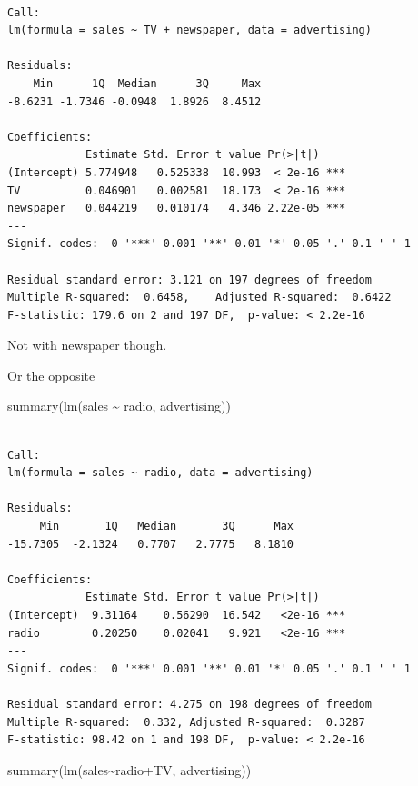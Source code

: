 \documentclass[
  letterpaper,
  DIV=11,
  numbers=noendperiod]{scrreprt}
\newenvironment{Shaded}{\begin{snugshade}}{\end{snugshade}}
\newcommand{\FunctionTok}[1]{\textcolor[rgb]{0.28,0.35,0.67}{#1}}
\newcommand{\NormalTok}[1]{\textcolor[rgb]{0.00,0.23,0.31}{#1}}
\newcommand{\SpecialCharTok}[1]{\textcolor[rgb]{0.37,0.37,0.37}{#1}}
\begin{document}
\begin{verbatim}

Call:
lm(formula = sales ~ TV + newspaper, data = advertising)

Residuals:
    Min      1Q  Median      3Q     Max 
-8.6231 -1.7346 -0.0948  1.8926  8.4512 

Coefficients:
            Estimate Std. Error t value Pr(>|t|)    
(Intercept) 5.774948   0.525338  10.993  < 2e-16 ***
TV          0.046901   0.002581  18.173  < 2e-16 ***
newspaper   0.044219   0.010174   4.346 2.22e-05 ***
---
Signif. codes:  0 '***' 0.001 '**' 0.01 '*' 0.05 '.' 0.1 ' ' 1

Residual standard error: 3.121 on 197 degrees of freedom
Multiple R-squared:  0.6458,    Adjusted R-squared:  0.6422 
F-statistic: 179.6 on 2 and 197 DF,  p-value: < 2.2e-16
\end{verbatim}

Not with newspaper though.

Or the opposite

\begin{Shaded}
\begin{Highlighting}[]
\FunctionTok{summary}\NormalTok{(}\FunctionTok{lm}\NormalTok{(sales }\SpecialCharTok{\textasciitilde{}}\NormalTok{ radio, advertising))}
\end{Highlighting}
\end{Shaded}

\begin{verbatim}

Call:
lm(formula = sales ~ radio, data = advertising)

Residuals:
     Min       1Q   Median       3Q      Max 
-15.7305  -2.1324   0.7707   2.7775   8.1810 

Coefficients:
            Estimate Std. Error t value Pr(>|t|)    
(Intercept)  9.31164    0.56290  16.542   <2e-16 ***
radio        0.20250    0.02041   9.921   <2e-16 ***
---
Signif. codes:  0 '***' 0.001 '**' 0.01 '*' 0.05 '.' 0.1 ' ' 1

Residual standard error: 4.275 on 198 degrees of freedom
Multiple R-squared:  0.332, Adjusted R-squared:  0.3287 
F-statistic: 98.42 on 1 and 198 DF,  p-value: < 2.2e-16
\end{verbatim}

\begin{Shaded}
\begin{Highlighting}[]
\FunctionTok{summary}\NormalTok{(}\FunctionTok{lm}\NormalTok{(sales}\SpecialCharTok{\textasciitilde{}}\NormalTok{radio}\SpecialCharTok{+}\NormalTok{TV, advertising))}
\end{Highlighting}
\end{Shaded}
\end{document}
